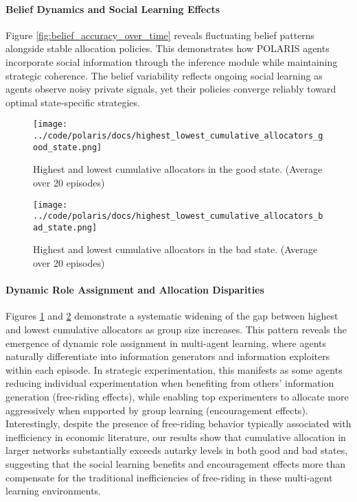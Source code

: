 \paragraph{Belief Dynamics and Social Learning Effects} Figure \ref{fig:belief_accuracy_over_time} reveals fluctuating belief patterns alongside stable allocation policies. This demonstrates how POLARIS agents incorporate social information through the inference module while maintaining strategic coherence. The belief variability reflects ongoing social learning as agents observe noisy private signals, yet their policies converge reliably toward optimal state-specific strategies.

\begin{figure}[!htbp]
    \centering
        \texttt{[image: ../code/polaris/docs/highest\_lowest\_cumulative\_allocators\_good\_state.png]}
        \caption{Highest and lowest cumulative allocators in the good state. (Average over 20 episodes)}
        \label{fig:highest_lowest_cumulative_allocators_good_state}
\end{figure}

\begin{figure}[!htbp]
    \centering
    \texttt{[image: ../code/polaris/docs/highest\_lowest\_cumulative\_allocators\_bad\_state.png]}
    \caption{Highest and lowest cumulative allocators in the bad state. (Average over 20 episodes)}
    \label{fig:highest_lowest_cumulative_allocators_bad_state}
\end{figure}
\paragraph{Dynamic Role Assignment and Allocation Disparities} Figures \ref{fig:highest_lowest_cumulative_allocators_good_state} and \ref{fig:highest_lowest_cumulative_allocators_bad_state} demonstrate a systematic widening of the gap between highest and lowest cumulative allocators as group size increases. This pattern reveals the emergence of dynamic role assignment in multi-agent learning, where agents naturally differentiate into information generators and information exploiters within each episode. In strategic experimentation, this manifests as some agents reducing individual experimentation when benefiting from others' information generation (free-riding effects), while enabling top experimenters to allocate more aggressively when supported by group learning (encouragement effects). Interestingly, despite the presence of free-riding behavior typically associated with inefficiency in economic literature, our results show that cumulative allocation in larger networks substantially exceeds autarky levels in both good and bad states, suggesting that the social learning benefits and encouragement effects more than compensate for the traditional inefficiencies of free-riding in these multi-agent learning environments.

